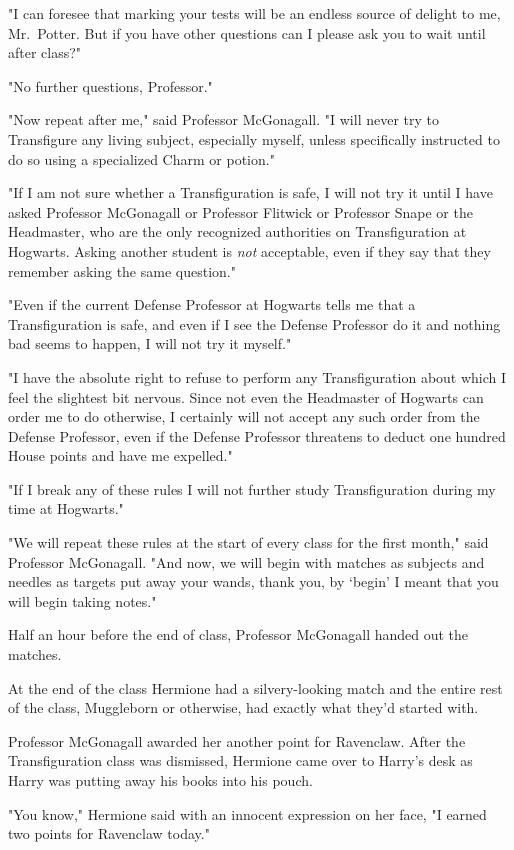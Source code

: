"I can foresee that marking your tests will be an endless source of delight to
me, Mr.~Potter. But if you have other questions can I please ask you to wait
until after class?"

"No further questions, Professor."

"Now repeat after me," said Professor McGonagall. "I will never try to
Transfigure any living subject, especially myself, unless specifically
instructed to do so using a specialized Charm or potion."

"If I am not sure whether a Transfiguration is safe, I will not try it until I
have asked Professor McGonagall or Professor Flitwick or Professor Snape or the
Headmaster, who are the only recognized authorities on Transfiguration at
Hogwarts. Asking another student is \emph{not} acceptable, even if they say
that they remember asking the same question."

"Even if the current Defense Professor at Hogwarts tells me that a
Transfiguration is safe, and even if I see the Defense Professor do it and
nothing bad seems to happen, I will not try it myself."

"I have the absolute right to refuse to perform any Transfiguration about which
I feel the slightest bit nervous. Since not even the Headmaster of Hogwarts can
order me to do otherwise, I certainly will not accept any such order from the
Defense Professor, even if the Defense Professor threatens to deduct one
hundred House points and have me expelled."

"If I break any of these rules I will not further study Transfiguration during
my time at Hogwarts."

"We will repeat these rules at the start of every class for the first month,"
said Professor McGonagall. "And now, we will begin with matches as subjects and
needles as targets{\el} put away your wands, thank you, by `begin' I meant
that you will begin taking notes."

Half an hour before the end of class, Professor McGonagall handed out the
matches.

At the end of the class Hermione had a silvery-looking match and the entire
rest of the class, Muggleborn or otherwise, had exactly what they'd started
with.

Professor McGonagall awarded her another point for Ravenclaw.
\sbreak
After the Transfiguration class was dismissed, Hermione came over to Harry's
desk as Harry was putting away his books into his pouch.

"You know," Hermione said with an innocent expression on her face, "I earned
two points for Ravenclaw today."

